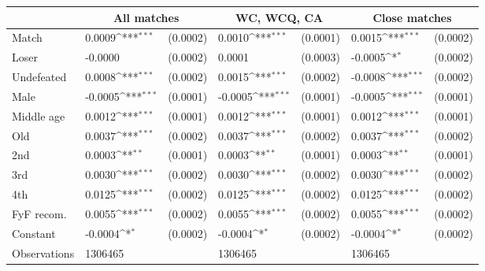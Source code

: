 {
\def\sym#1{\ifmmode^{#1}\else\(^{#1}\)\fi}
\begin{tabular*}{1\hsize}{@{\hskip\tabcolsep\extracolsep\fill}l*{3}{lc}}
\toprule
                &\multicolumn{2}{c}{All matches}&\multicolumn{2}{c}{WC, WCQ, CA}&\multicolumn{2}{c}{Close matches}\\
\midrule
Match           &   0.0009\sym{***}& (0.0002)&   0.0010\sym{***}& (0.0001)&   0.0015\sym{***}& (0.0002)\\
Loser           &  -0.0000         & (0.0002)&   0.0001         & (0.0003)&  -0.0005\sym{*}  & (0.0002)\\
Undefeated      &   0.0008\sym{***}& (0.0002)&   0.0015\sym{***}& (0.0002)&  -0.0008\sym{***}& (0.0002)\\
Male            &  -0.0005\sym{***}& (0.0001)&  -0.0005\sym{***}& (0.0001)&  -0.0005\sym{***}& (0.0001)\\
Middle age      &   0.0012\sym{***}& (0.0001)&   0.0012\sym{***}& (0.0001)&   0.0012\sym{***}& (0.0001)\\
Old             &   0.0037\sym{***}& (0.0002)&   0.0037\sym{***}& (0.0002)&   0.0037\sym{***}& (0.0002)\\
2nd             &   0.0003\sym{**} & (0.0001)&   0.0003\sym{**} & (0.0001)&   0.0003\sym{**} & (0.0001)\\
3rd             &   0.0030\sym{***}& (0.0002)&   0.0030\sym{***}& (0.0002)&   0.0030\sym{***}& (0.0002)\\
4th             &   0.0125\sym{***}& (0.0002)&   0.0125\sym{***}& (0.0002)&   0.0125\sym{***}& (0.0002)\\
FyF recom.      &   0.0055\sym{***}& (0.0002)&   0.0055\sym{***}& (0.0002)&   0.0055\sym{***}& (0.0002)\\
Constant        &  -0.0004\sym{*}  & (0.0002)&  -0.0004\sym{*}  & (0.0002)&  -0.0004\sym{*}  & (0.0002)\\
\midrule
Observations    &  1306465         &         &  1306465         &         &  1306465         &         \\
\bottomrule
\end{tabular*}
}
